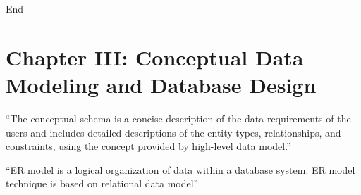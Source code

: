 \documentclass[10pt]{article}
\newcommand{\quotes}[1]{``#1''}
\begin{document}
\bigbreak
\begin{center}
	End
\end{center}
\pagebreak

\section{Chapter III: Conceptual Data Modeling and Database Design}

\quotes{The conceptual schema is a concise description of the data requirements of the users and includes detailed descriptions of the entity types, relationships, and constraints, using the concept provided by high-level data model.}

\quotes{ER model is a logical organization of data within a database system. ER model technique is based on relational data model}
\end{document}
